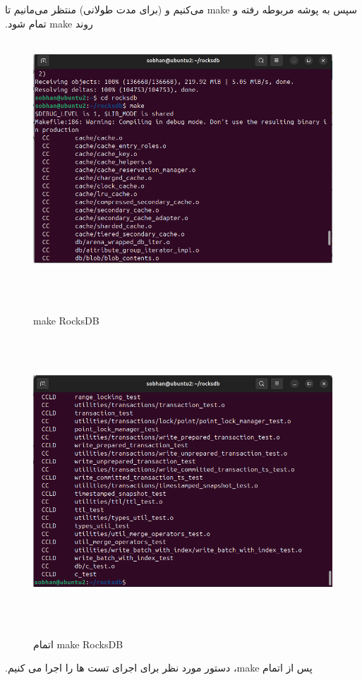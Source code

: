 ‫
‫سپس به پوشه مربوطه رفته و make می‌کنیم و (برای مدت طولانی) منتظر می‌مانیم تا روند make تمام شود.
‫
‫\begin{figure}[H]
‫    \centering
‫    \includegraphics[width=\textwidth]{figs/2.png}
‫    \caption{make RocksDB}
‫\end{figure}
‫
‫\begin{figure}[H]
‫    \centering
‫    \includegraphics[width=\textwidth]{figs/3.png}
‫    \caption{اتمام make RocksDB}
‫\end{figure}
‫
‫پس از اتمام make، دستور مورد نظر برای اجرای تست ها را اجرا می کنیم.


